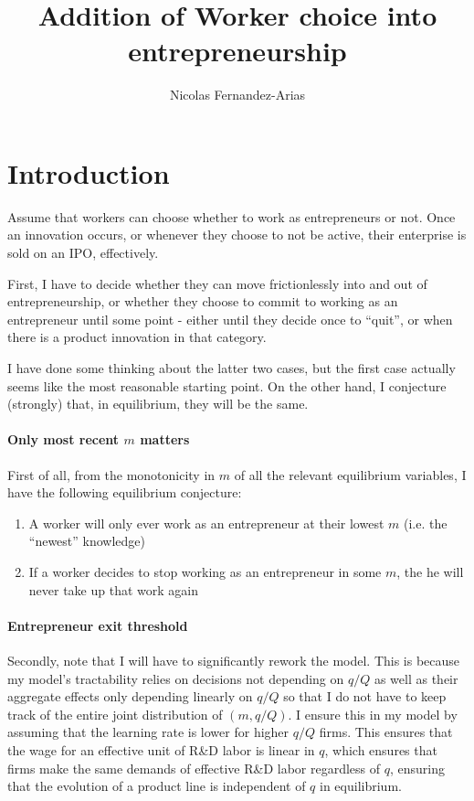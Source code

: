 \documentclass[12pt,english]{article}
\theoremstyle{remark}
\begin{document}
	
\title{Addition of Worker choice into entrepreneurship}
\author{Nicolas Fernandez-Arias}
\maketitle

\section{Introduction}

Assume that workers can choose whether to work as entrepreneurs or not. Once an innovation occurs, or whenever they choose to not be active, their enterprise is sold on an IPO, effectively.

First, I have to decide whether they can move frictionlessly into and out of entrepreneurship, or whether they choose to commit to working as an entrepreneur until some point - either until they decide once to ``quit'', or when there is a product innovation in that category.

I have done some thinking about the latter two cases, but the first case actually seems like the most reasonable starting point. On the other hand, I conjecture (strongly) that, in equilibrium, they will be the same.

\paragraph{Only most recent $m$ matters}First of all, from the monotonicity in $m$ of all the relevant equilibrium variables, I have the following equilibrium conjecture:

\begin{enumerate}
	\item A worker will only ever work as an entrepreneur at their lowest $m$ (i.e. the ``newest'' knowledge)
	\item If a worker decides to stop working as an entrepreneur in some $m$, the he will never take up that work again
\end{enumerate} 

\paragraph{Entrepreneur exit threshold}Secondly, note that I will have to significantly rework the model. This is because my model's tractability relies on decisions not depending on $q/Q$ as well as their aggregate effects only depending linearly on $q/Q$ so that I do not have to keep track of the entire joint distribution of $(m,q/Q)$. I ensure this in my model by assuming that the learning rate is lower for higher $q/Q$ firms. This ensures that the wage for an effective unit of R\&D labor is linear in $q$, which ensures that firms make the same demands of effective R\&D labor regardless of $q$, ensuring that the evolution of a product line is independent of $q$ in equilibrium.
\end{document}
